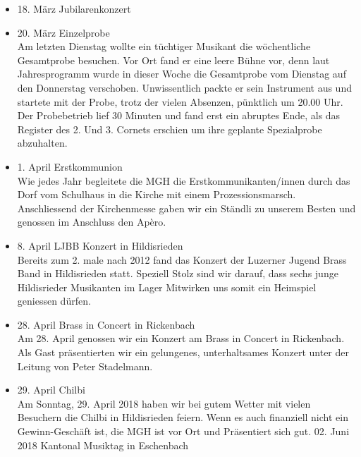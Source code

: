 \begin{history}
\begin{itemize}
            \item 18. März Jubilarenkonzert

            \item 20. März Einzelprobe\\
                  Am letzten Dienstag wollte ein tüchtiger Musikant die
                  wöchentliche Gesamtprobe besuchen. Vor Ort fand er eine leere
                  Bühne vor, denn laut Jahresprogramm wurde in dieser Woche die
                  Gesamtprobe vom Dienstag auf den Donnerstag verschoben.
                  Unwissentlich packte er sein Instrument aus und startete mit
                  der Probe, trotz der vielen Absenzen, pünktlich um 20.00 Uhr.
                  Der Probebetrieb lief 30 Minuten und fand erst ein abruptes
                  Ende, als das Register des 2. Und 3. Cornets erschien um ihre
                  geplante Spezialprobe abzuhalten.

            \item 1. April  Erstkommunion\\
                  Wie jedes Jahr begleitete die MGH die Erstkommunikanten/innen
                  durch das Dorf vom Schulhaus in die Kirche mit einem
                  Prozessionsmarsch. Anschliessend der Kirchenmesse gaben wir
                  ein Ständli zu unserem Besten und genossen im Anschluss den
                  Apèro.

            \item 8. April LJBB Konzert in Hildisrieden\\
                  Bereits zum 2. male nach 2012 fand das Konzert der Luzerner
                  Jugend Brass Band in Hildisrieden statt. Speziell Stolz sind
                  wir darauf, dass sechs junge Hildisrieder Musikanten im Lager
                  Mitwirken uns somit ein Heimspiel geniessen dürfen.

            \item 28. April Brass in Concert in Rickenbach\\
                  Am 28. April genossen wir ein Konzert am Brass in Concert in
                  Rickenbach. Als Gast präsentierten wir ein gelungenes,
                  unterhaltsames Konzert unter der Leitung von Peter Stadelmann.

            \item 29. April Chilbi\\
                  Am Sonntag, 29. April 2018 haben wir bei gutem Wetter mit
                  vielen Besuchern die Chilbi in Hildisrieden feiern. Wenn es
                  auch finanziell nicht ein Gewinn-Geschäft ist, die MGH ist vor
                  Ort und Präsentiert sich gut. 02. Juni 2018 Kantonal Musiktag
                  in Eschenbach


\end{itemize}
\end{history}
